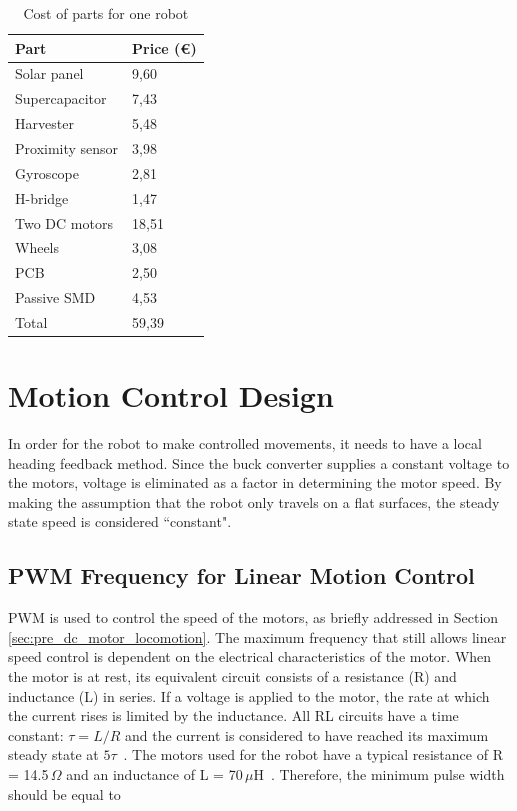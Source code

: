 \begin{table}[t]
	\centering
	\caption{Cost of parts for one robot}
	\label{tab:cost_robot}
	\begin{tabular}{|l|l|} 
		\hline
		Part & Price (\euro) \\
		\hline\hline
		Solar panel & 9,60\\
		Supercapacitor & 7,43\\
		Harvester & 5,48 \\
		Proximity sensor & 3,98 \\
		Gyroscope & 2,81\\	
		H-bridge & 1,47 \\
		Two DC motors & 18,51 \\
		Wheels & 3,08\\
		PCB & 2,50 \\
		Passive SMD & 4,53\\
		\hline \hline
		Total & 59,39 \\
		\hline
	\end{tabular}
\end{table}


\section{Motion Control Design}
\label{sec:dai_control_design}
In order for the robot to make controlled movements, it needs to have a local heading feedback method.
Since the buck converter supplies a constant voltage to the motors, voltage is eliminated as a factor in determining the motor speed.
By making the assumption that the robot only travels on a flat surfaces, the steady state speed is considered ``constant".

\subsection{PWM Frequency for Linear Motion Control}
\label{sec:cd_pwm_frequency}

PWM is used to control the speed of the motors, as briefly addressed in Section \ref{sec:pre_dc_motor_locomotion}.
The maximum frequency that still allows linear speed control is dependent on the electrical characteristics of the motor.
When the motor is at rest, its equivalent circuit consists of a resistance (R) and inductance (L) in series.
If a voltage is applied to the motor, the rate at which the current rises is limited by the inductance. 
All RL circuits have a time constant: $\tau = L / R$ and the current is considered to have reached its maximum steady state at $5\tau$~\cite{pmw_linear_motion_2017}. 
The motors used for the robot have a typical resistance of R = 14.5\,$\Omega$ and an inductance of L = 70\,$\mu$H~\cite{gearmotor_206-110_2017}.
Therefore, the minimum pulse width should be equal to

